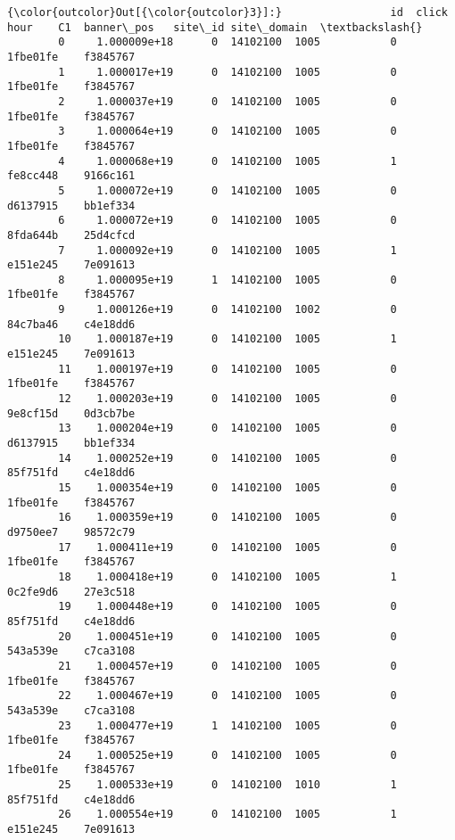 \documentclass[11pt]{article}
\begin{document}
\begin{Verbatim}[commandchars=\\\{\}]
{\color{outcolor}Out[{\color{outcolor}3}]:}                 id  click      hour    C1  banner\_pos   site\_id site\_domain  \textbackslash{}
        0     1.000009e+18      0  14102100  1005           0  1fbe01fe    f3845767   
        1     1.000017e+19      0  14102100  1005           0  1fbe01fe    f3845767   
        2     1.000037e+19      0  14102100  1005           0  1fbe01fe    f3845767   
        3     1.000064e+19      0  14102100  1005           0  1fbe01fe    f3845767   
        4     1.000068e+19      0  14102100  1005           1  fe8cc448    9166c161   
        5     1.000072e+19      0  14102100  1005           0  d6137915    bb1ef334   
        6     1.000072e+19      0  14102100  1005           0  8fda644b    25d4cfcd   
        7     1.000092e+19      0  14102100  1005           1  e151e245    7e091613   
        8     1.000095e+19      1  14102100  1005           0  1fbe01fe    f3845767   
        9     1.000126e+19      0  14102100  1002           0  84c7ba46    c4e18dd6   
        10    1.000187e+19      0  14102100  1005           1  e151e245    7e091613   
        11    1.000197e+19      0  14102100  1005           0  1fbe01fe    f3845767   
        12    1.000203e+19      0  14102100  1005           0  9e8cf15d    0d3cb7be   
        13    1.000204e+19      0  14102100  1005           0  d6137915    bb1ef334   
        14    1.000252e+19      0  14102100  1005           0  85f751fd    c4e18dd6   
        15    1.000354e+19      0  14102100  1005           0  1fbe01fe    f3845767   
        16    1.000359e+19      0  14102100  1005           0  d9750ee7    98572c79   
        17    1.000411e+19      0  14102100  1005           0  1fbe01fe    f3845767   
        18    1.000418e+19      0  14102100  1005           1  0c2fe9d6    27e3c518   
        19    1.000448e+19      0  14102100  1005           0  85f751fd    c4e18dd6   
        20    1.000451e+19      0  14102100  1005           0  543a539e    c7ca3108   
        21    1.000457e+19      0  14102100  1005           0  1fbe01fe    f3845767   
        22    1.000467e+19      0  14102100  1005           0  543a539e    c7ca3108   
        23    1.000477e+19      1  14102100  1005           0  1fbe01fe    f3845767   
        24    1.000525e+19      0  14102100  1005           0  1fbe01fe    f3845767   
        25    1.000533e+19      0  14102100  1010           1  85f751fd    c4e18dd6   
        26    1.000554e+19      0  14102100  1005           1  e151e245    7e091613   

\end{Verbatim}
\end{document}

